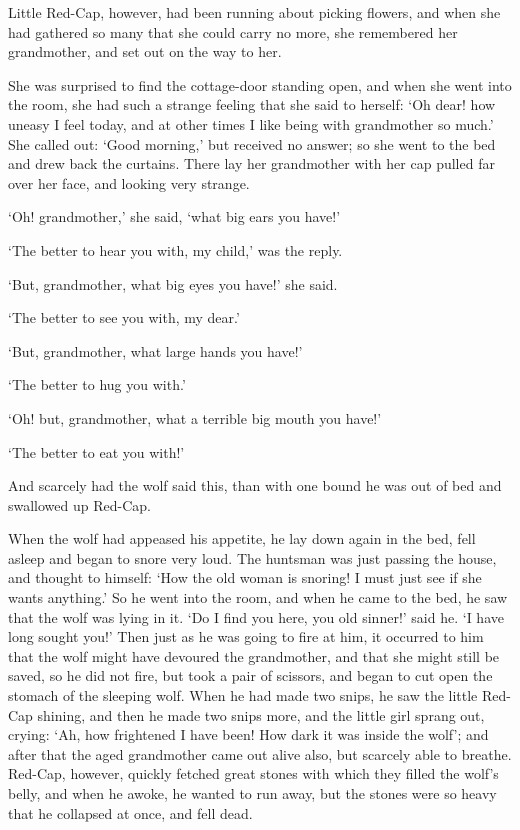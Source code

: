 \documentclass[oneside,11pt]{memoir} %
\begin{document}
	Little Red-Cap, however, had been running about picking flowers, and when she had gathered so many that she could carry no more, she remembered her grandmother, and set out on the way to her.
	
	She was surprised to find the cottage-door standing open, and when she went into the room, she had such a strange feeling that she said to herself: `Oh dear! how uneasy I feel today, and at other times I like being with grandmother so much.' She called out: `Good morning,' but received no answer; so she went to the bed and drew back the curtains. There lay her grandmother with her cap pulled far over her face, and looking very strange.
	
	`Oh! grandmother,' she said, `what big ears you have!'
	
	`The better to hear you with, my child,' was the reply.
	
	`But, grandmother, what big eyes you have!' she said.
	
	`The better to see you with, my dear.'
	
	`But, grandmother, what large hands you have!'
	
	`The better to hug you with.'
	
	`Oh! but, grandmother, what a terrible big mouth you have!'
	
	`The better to eat you with!'
	
	And scarcely had the wolf said this, than with one bound he was out of bed and swallowed up Red-Cap.
	
	When the wolf had appeased his appetite, he lay down again in the bed, fell asleep and began to snore very loud. The huntsman was just passing the house, and thought to himself: `How the old woman is snoring! I must just see if she wants anything.' So he went into the room, and when he
	came to the bed, he saw that the wolf was lying in it. `Do I find you here, you old sinner!' said he. `I have long sought you!' Then just as he was going to fire at him, it occurred to him that the wolf might have devoured the grandmother, and that she might still be saved, so he did not fire, but took a pair of scissors, and began to cut open the stomach of the sleeping wolf. When he had made two snips, he saw the little Red-Cap shining, and then he made two snips more, and the little girl sprang out, crying: `Ah, how frightened I have been! How dark it was inside the wolf'; and after that the aged grandmother came out alive also, but scarcely able to breathe. Red-Cap, however, quickly fetched
	great stones with which they filled the wolf's belly, and when he awoke, he wanted to run away, but the stones were so heavy that he collapsed at once, and fell dead.
	
\end{document}
